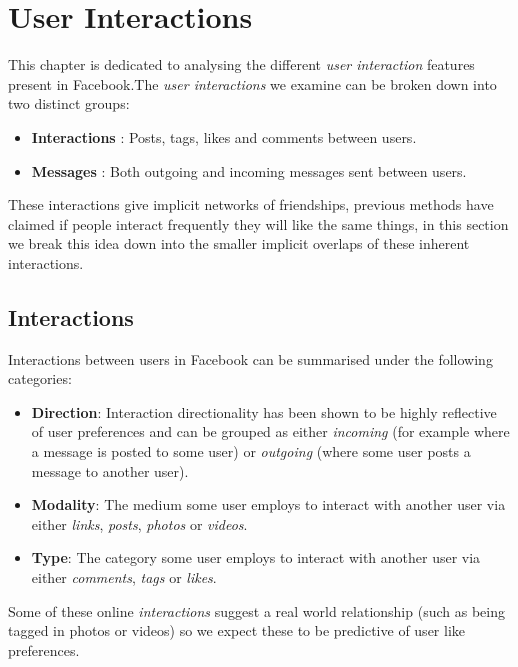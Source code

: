 
\chapter{User Interactions}
\label{cha:interactions}

This chapter is dedicated to analysing the different \emph{user interaction} features present in Facebook.The \emph{user interactions} we examine can be broken down into two distinct groups:
\begin{itemize}
\item \textbf{Interactions} : Posts, tags, likes and comments between users.
\item \textbf{Messages} : Both outgoing and incoming messages sent between users.
\end{itemize}

These interactions give implicit networks of friendships, previous methods \cite{www} have claimed if people interact frequently 
they will like the same things, in this section we break this idea down into the smaller implicit overlaps of these inherent interactions.

\section{Interactions}
\label{sec:inter}

Interactions between users in Facebook can be summarised under the following categories:

\begin{itemize}
\item \textbf{Direction}: Interaction directionality has been shown to be highly 
reflective of user preferences \cite{saez2011high} and can be grouped as either \emph{incoming} (for example where a message is posted to some user) or 
\emph{outgoing} (where some user posts a message to another user). 
\item \textbf{Modality}: The medium some user employs to interact with another user via either \emph{links}, \emph{posts}, \emph{photos} or \emph{videos}.
\item \textbf{Type}: The category some user employs to interact with another user via either \emph{comments}, \emph{tags} or \emph{likes}.
\end{itemize}

Some of these online \emph{interactions} suggest a real world relationship (such as being tagged in photos or videos) so we expect these to be predictive of user like preferences.

